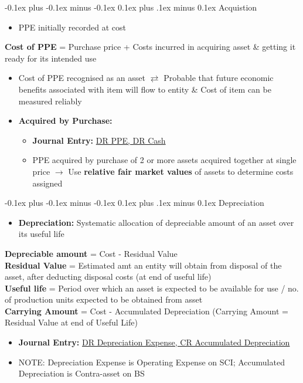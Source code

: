 \documentclass[landscape]{article}
\makeatletter
\renewcommand{\subsection}{\@startsection{subsection}{2}{0mm}%
  {-0.1ex plus -0.1ex minus -0.1ex}%
  {0.1ex plus .1ex minus 0.1ex}%
{\normalfont\scriptsize\bfseries}}
\makeatother
\begin{document}
\begin{multicols}{6}
    \subsection{Acquistion} 
    \begin{itemize}
      \item PPE initially recorded at cost
    \end{itemize}
    \begin{fixedbox}[0.9]
      \textbf{Cost of PPE} = Purchase price + Costs incurred in acquiring asset \& getting it ready for its intended use
    \end{fixedbox}
    \begin{itemize}
      \item Cost of PPE recognised as an asset $\rightleftarrows$ Probable that future economic benefits associated with item will flow to entity \& Cost of item can be measured reliably
    \end{itemize}
    \begin{itemize}
      \item \textbf{Acquired by Purchase:}
      \begin{itemize}
        \item \textbf{Journal Entry:} \underline{DR PPE, DR Cash}
        \item PPE acquired by purchase of 2 or more assets acquired together at single price $\rightarrow$ Use \textbf{relative fair market values} of assets to determine costs assigned
      \end{itemize}
    \end{itemize}

    \subsection{Depreciation}
    \begin{itemize}
      \item \textbf{Depreciation:} Systematic allocation of depreciable amount of an asset over its useful life
    \end{itemize}
    \begin{fixedbox}[0.9]
      \textbf{Depreciable amount} = Cost - Residual Value
      \\ \textbf{Residual Value} = Estimated amt an entity will obtain from disposal of the asset, after deducting disposal costs (at end of useful life)
      \\ \textbf{Useful life} = Period over which an asset is expected to be available for use / no. of production units expected to be obtained from asset
      \\ \textbf{Carrying Amount} = Cost - Accumulated Depreciation (Carrying Amount = Residual Value at end of Useful Life)
    \end{fixedbox}
    \begin{itemize}
      \item \textbf{Journal Entry:} \underline{DR Depreciation Expense, CR Accumulated Depreciation}
      \item NOTE: Depreciation Expense is Operating Expense on SCI; Accumulated Depreciation is Contra-asset on BS
    \end{itemize}

\end{multicols}
\end{document}
